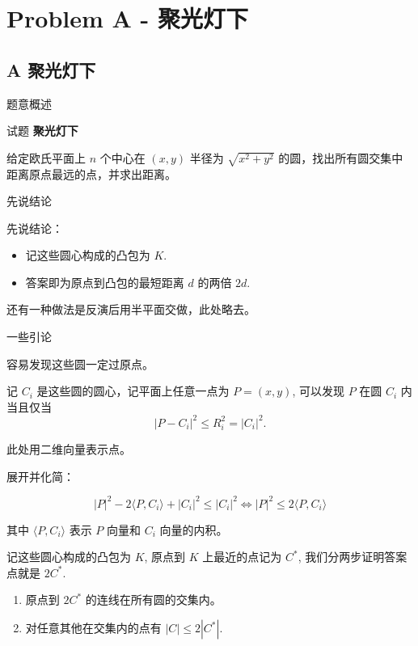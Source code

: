 \documentclass{beamer}
\newcommand{\TT}[1] {{\ttfamily #1}}
\newcommand{\BF}[1] {\textbf{#1}}
\begin{document}
{

\section[A]{Problem A - 聚光灯下}
\subsection{A 聚光灯下}

\begin{frame}{题意概述}

\begin{center}
试题 \myboxi{      \BF{\TT{A}}} \BF{聚光灯下}
\end{center}

给定欧氏平面上 $n$ 个中心在 $(x, y)$ 半径为 $\sqrt{x^2 + y^2}$ 的圆，找出所有圆交集中距离原点最远的点，并求出距离。

\end{frame}

\begin{frame}{先说结论}

先说结论：

\begin{itemize}
  \item 记这些圆心构成的凸包为 $K$.
  \item 答案即为原点到凸包的最短距离 $d$ 的两倍 $2d$.
\end{itemize}

还有一种做法是反演后用半平面交做，此处略去。

\end{frame}

\begin{frame}{一些引论}

容易发现这些圆一定过原点。

记 $C_i$ 是这些圆的圆心，记平面上任意一点为 $P = (x, y)$, 可以发现 $P$ 在圆 $C_i$ 内当且仅当 \[
  |P - C_i|^2 \le R_i^2 = |C_i|^2.
\]

此处用二维向量表示点。

展开并化简：

\[
  |P|^2 - 2 \langle P, C_i \rangle + |C_i|^2 \le |C_i| ^2 \Leftrightarrow  |P|^2 \le 2 \langle P, C_i \rangle
\]

其中 $\langle P, C_i \rangle$ 表示 $P$ 向量和 $C_i$ 向量的内积。

记这些圆心构成的凸包为 $K$, 原点到 $K$ 上最近的点记为 $C^\ast$, 我们分两步证明答案点就是 $2C^\ast$.

\begin{enumerate}
  \item 原点到 $2C^\ast$ 的连线在所有圆的交集内。
  \item 对任意其他在交集内的点有 $|C| \le 2|C^\ast|$.
\end{enumerate}


\end{frame}}
\end{document}
